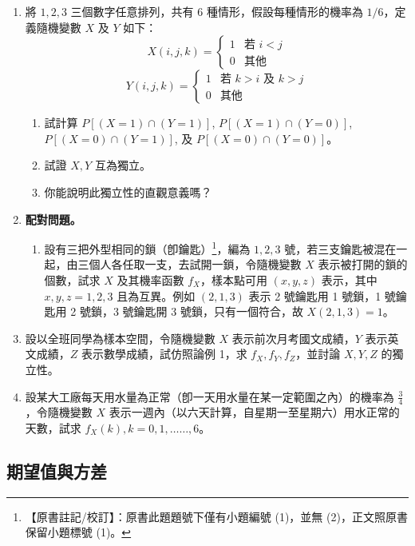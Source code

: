 \begin{enumerate}[label=\textbf{\arabic*.}]
  \item 將 $1, 2, 3$ 三個數字任意排列，共有 6 種情形，假設每種情形的機率為 $1/6$，定義隨機變數 $X$ 及 $Y$ 如下：
  \[
  X(i, j, k) = \begin{cases}
  1 & \text{若 } i < j \\
  0 & \text{其他}
  \end{cases}
  \]
  \[
  Y(i, j, k) = \begin{cases}
  1 & \text{若 } k > i \text{ 及 } k > j \\
  0 & \text{其他}
  \end{cases}
  \]
  \begin{enumerate}[(1)]
    \item 試計算 $P[(X = 1) \cap (Y = 1)]$, $P[(X = 1) \cap (Y = 0)]$, $P[(X = 0) \cap (Y = 1)]$, 及 $P[(X = 0) \cap (Y = 0)]$。
    \item 試證 $X, Y$ 互為獨立。
    \item 你能說明此獨立性的直觀意義嗎？
  \end{enumerate}

  \item \textbf{配對問題。}
  \begin{enumerate}[(1)]
    \item 設有三把外型相同的鎖（卽鑰匙）\label{note:b5s-ch5-p153-q6}\footnote{【原書註記/校訂】：原書此題題號下僅有小題編號 (1)，並無 (2)，正文照原書保留小題標號 (1)。}，編為 $1, 2, 3$ 號，若三支鑰匙被混在一起，由三個人各任取一支，去試開一鎖，令隨機變數 $X$ 表示被打開的鎖的個數，試求 $X$ 及其機率函數 $f_X$，樣本點可用 $(x, y, z)$ 表示，其中 $x, y, z = 1, 2, 3$ 且為互異。例如 $(2, 1, 3)$ 表示 2 號鑰匙用 1 號鎖，1 號鑰匙用 2 號鎖，3 號鑰匙開 3 號鎖，只有一個符合，故 $X(2, 1, 3) = 1$。
  \end{enumerate}

  \item 設以全班同學為樣本空間，令隨機變數 $X$ 表示前次月考國文成績，$Y$ 表示英文成績，$Z$ 表示數學成績，試仿照論例 1，求 $f_X, f_Y, f_Z$，並討論 $X, Y, Z$ 的獨立性。

  \item 設某大工廠每天用水量為正常（卽一天用水量在某一定範圍之內）的機率為 $\frac{3}{4}$，令隨機變數 $X$ 表示一週內（以六天計算，自星期一至星期六）用水正常的天數，試求 $f_X(k), k = 0, 1, \dots\dots, 6$。
\end{enumerate}
\subsection{期望值與方差}\label{sec:b5s-5-2}

